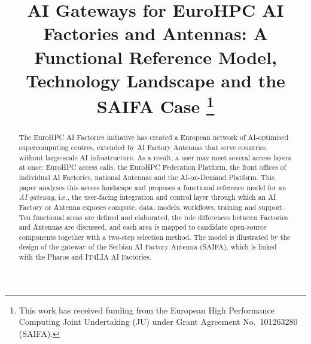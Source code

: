 \documentclass[conference,a4paper]{IEEEtran}
\begin{document}
\title{AI Gateways for EuroHPC AI Factories and Antennas: A Functional Reference Model, Technology Landscape and the SAIFA Case%
\thanks{This work has received funding from the European High Performance Computing Joint Undertaking (JU) under Grant Agreement No.~101263280 (SAIFA).}}

\author{
\and
{}
\and
{}
}

\maketitle

\begin{abstract}
The EuroHPC AI Factories initiative has created a European network of AI-optimised supercomputing centres, extended by AI Factory Antennas that serve countries without large-scale AI infrastructure. As a result, a user may meet several access layers at once: EuroHPC access calls, the EuroHPC Federation Platform, the front offices of individual AI Factories, national Antennas and the AI-on-Demand Platform. This paper analyses this access landscape and proposes a functional reference model for an \emph{AI gateway}, i.e., the user-facing integration and control layer through which an AI Factory or Antenna exposes compute, data, models, workflows, training and support. Ten functional areas are defined and elaborated, the role differences between Factories and Antennas are discussed, and each area is mapped to candidate open-source components together with a two-step selection method. The model is illustrated by the design of the gateway of the Serbian AI Factory Antenna (SAIFA), which is linked with the Pharos and IT4LIA AI Factories.
\end{abstract}
\end{document}
